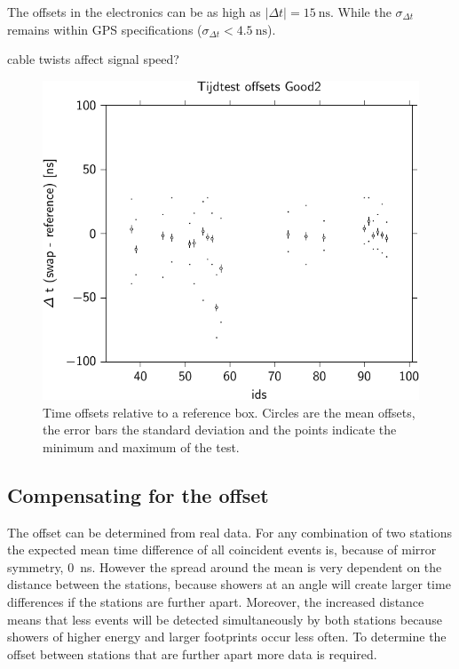 
The offsets in the \hisparc electronics can be as high as $|\Delta t| = \SI{15}{\ns}$. While the $\sigma_{\Delta t}$ remains within GPS specifications ($\sigma_{\Delta t} < \SI{4.5}{\ns}$).


\gps cable twists affect signal speed?

\begin{figure}
    \centering
    \includegraphics{plots/cluster/hisparc_offsets}
    \caption{Time offsets relative to a reference box. Circles are the
             mean offsets, the error bars the standard deviation and the
             points indicate the minimum and maximum of the test.}
    \label{fig:hisparc_offsets}
\end{figure}


\subsection{Compensating for the offset}

The offset can be determined from real data. For any combination of two stations the expected mean time difference of all coincident events is, because of mirror symmetry, \SI{0}{\ns}. However the spread around the mean is very dependent on the distance between the stations, because showers at an angle will create larger time differences if the stations are further apart. Moreover, the increased distance means that less events will be detected simultaneously by both stations because showers of higher energy and larger footprints occur less often. To determine the offset between stations that are further apart more data is required.


